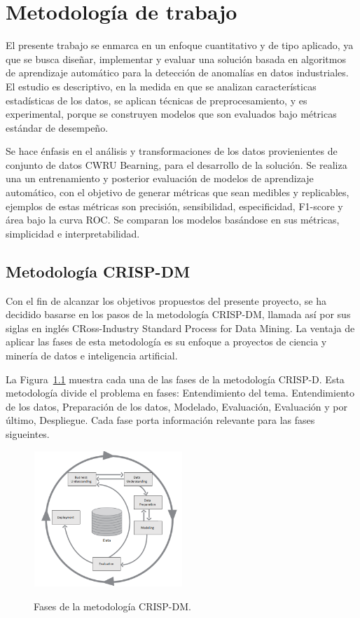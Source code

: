 \documentclass[11pt,a4paper,spanish]{book}
\numberwithin{equation}{chapter}
\numberwithin{figure}{chapter}
\begin{document}
\chapter{Metodología de trabajo}


El presente trabajo se enmarca en un enfoque cuantitativo y de tipo aplicado, ya que se 
busca diseñar, implementar y evaluar una solución basada en algoritmos de aprendizaje 
automático para la detección de anomalías en datos industriales. 
El estudio es descriptivo, en la medida en que se analizan características estadísticas 
de los datos, se aplican técnicas de preprocesamiento, y es experimental, porque se 
construyen modelos que son evaluados bajo métricas estándar de desempeño. 


Se hace énfasis en el análisis y transformaciones de 
los datos provienientes de conjunto de datos CWRU Bearning, para el desarrollo de la 
solución. Se realiza una un entrenamiento y posterior evaluación de modelos de aprendizaje 
automático, con el objetivo de generar métricas que sean medibles y replicables, 
ejemplos de estas 
métricas son precisión, sensibilidad, especificidad, F1-score y área bajo la curva ROC.
Se comparan los modelos basándose en sus métricas, simplicidad e interpretabilidad. 


\section{Metodología CRISP-DM}



Con el fin de alcanzar los objetivos propuestos del presente proyecto, se ha decidido 
basarse en los pasos de la metodología  CRISP-DM, llamada así por sus siglas en inglés 
CRoss-Industry Standard Process for Data Mining. 
La ventaja de aplicar las fases de esta
metodología es su enfoque a proyectos de ciencia y minería de datos e inteligencia 
artificial. 


La Figura~\ref{fig:figCrispdm} muestra cada una de las fases de la metodología CRISP-D.
Esta metodología divide el problema en fases: Entendimiento del tema. Entendimiento de los datos,
Preparación de los datos, Modelado, Evaluación, Evaluación y por último,  Despliegue. 
Cada fase porta información relevante para las fases sigueintes. 


\begin{figure}[h]
    \caption{Fases de la metodología {CRISP-DM}. \protect\cite{chapman2000crisp}}
    \centering
    \includegraphics[width=0.5\textwidth]{media/crisp-dm.png}
    \label{fig:figCrispdm}
\end{figure}
\end{document}
